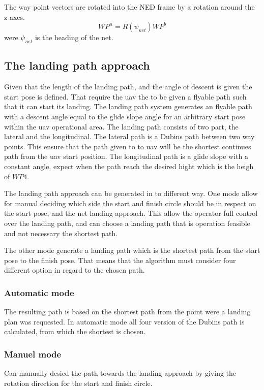 The way point vectors are rotated into the NED frame by a rotation around the z-axes.
\begin{equation}
WP^n = R(\psi_{net})WP^b
\end{equation}
were $\psi_{net}$ is the heading of the net.
\begin{figure}
\def\svgwidth{\textwidth} %

\end{figure}

\subsection{The landing path approach}
Given that the length of the landing path, and the angle of descent is given the start pose is defined. That require the uav the to be given a flyable path such that it can start its landing. The landing path system generates an flyable path with a descent angle equal to the glide slope angle for an arbitrary start pose within the uav operational area. The landing path consists of two part, the lateral and the longitudinal. The lateral path is a Dubins path between two way points. This ensure that the path given to to uav will be the shortest continues path from the uav start position. The longitudinal path is a glide slope with a constant angle, expect when the path reach the desired hight which is the heigh of $WP4$.

The landing path approach can be generated in to different way. One mode allow for manual deciding which side the start and finish circle should be in respect on the start pose, and the net landing approach. This allow the operator full control over the landing path, and can choose a landing path that is operation feasible and not necessary the shortest path.

The other mode generate a landing path which is the shortest path from the start pose to the finish pose. That means that the algorithm must consider four different option in regard to the chosen path.
\subsubsection{Automatic mode}
The resulting path is based on the shortest path from the point were a landing plan was requested. In automatic mode all four version of the Dubins path is calculated, from which the shortest is chosen.
\subsubsection{Manuel mode}
Can manually desied the path towards the landing approach by giving the rotation direction for the start and finish circle. 
